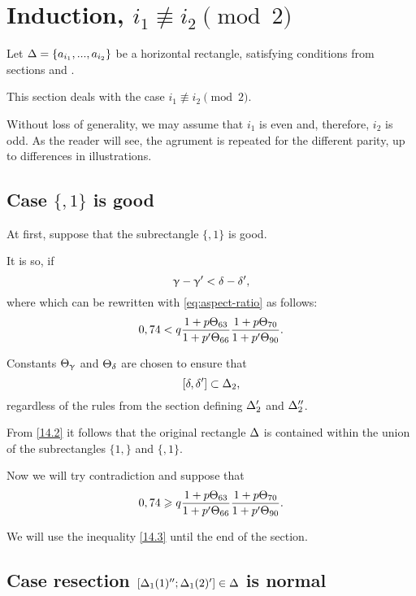 \section{Induction, $i_1 \not\equiv i_2 \pmod 2$}

Let $\Delta = \{ a_{i_1}, ..., a_{i_2}\}$ be a horizontal rectangle,
satisfying conditions from sections  and .

This section deals with the case $i_1 \not\equiv i_2 \pmod 2$.

Without loss of generality, we may assume that $i_1$ is even and, therefore, $i_2$ is odd.
As the reader will see, the agrument is repeated for the different parity,
up to differences in illustrations.

\subsection{Case $\{, 1\}$ is good}

At first, suppose that the subrectangle $\{,1\}$ is good.

It is so, if
\begin{equation*}
	\upgamma - \upgamma' < \delta - \delta',
\end{equation*}
where
which can be rewritten with \ref{eq:aspect-ratio} as follows:
\begin{equation}\label{14.2}
	0,74 < q
	\dfrac{1 + p\Theta_{63}}{1 + p'\Theta_{66}}
	\dfrac{1 + p\Theta_{70}}{1 + p'\Theta_{90}}.
\end{equation}

Constants $\Theta_{\upgamma}$ and $\Theta_{\delta}$ are chosen to ensure that
\begin{equation*}
	\left[ \delta, \delta' \right] \subset \Delta_2,
\end{equation*}
regardless of the rules from the section  defining $\Delta_2'$ and $\Delta_2''$.

From \ref{14.2} it follows that the original rectangle $\Delta$ is contained
within the union of the subrectangles $\{1,\}$ and $\{,1\}$.

Now we will try contradiction and suppose that
\begin{equation}\label{14.3}
	0,74 \geqslant q
	\dfrac{1 + p\Theta_{63}}{1 + p'\Theta_{66}}
	\dfrac{1 + p\Theta_{70}}{1 + p'\Theta_{90}}.
\end{equation}

We will use the inequality \ref{14.3} until the end of the section.


\subsection{Case resection $\left[ \Delta_1(1)''; \Delta_1(2)' \right] \in \Delta$ is normal}


